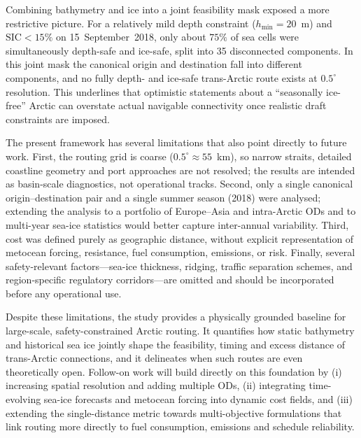 Combining bathymetry and ice into a joint feasibility mask exposed a
more restrictive picture.  For a relatively mild depth constraint
($h_{\min}=20$~m) and $\mathrm{SIC}<15\%$ on 15~September~2018, only
about $75\%$ of sea cells were simultaneously depth-safe and ice-safe,
split into 35 disconnected components.  In this joint mask the canonical
origin and destination fall into different components, and no fully
depth- and ice-safe trans-Arctic route exists at $0.5^{\circ}$
resolution.  This underlines that optimistic statements about a
``seasonally ice-free'' Arctic can overstate actual navigable
connectivity once realistic draft constraints are imposed.

The present framework has several limitations that also point directly
to future work.  First, the routing grid is coarse
($0.5^{\circ}\approx 55$~km), so narrow straits, detailed coastline
geometry and port approaches are not resolved; the results are intended
as basin-scale diagnostics, not operational tracks.  Second, only a
single canonical origin–destination pair and a single summer season
(2018) were analysed; extending the analysis to a portfolio of
Europe–Asia and intra-Arctic ODs and to multi-year sea-ice statistics
would better capture inter-annual variability.  Third, cost was defined
purely as geographic distance, without explicit representation of
metocean forcing, resistance, fuel consumption, emissions, or risk.
Finally, several safety-relevant factors---sea-ice thickness, ridging,
traffic separation schemes, and region-specific regulatory corridors---are
omitted and should be incorporated before any operational use.

Despite these limitations, the study provides a physically grounded
baseline for large-scale, safety-constrained Arctic routing.  It
quantifies how static bathymetry and historical sea ice jointly shape
the feasibility, timing and excess distance of trans-Arctic connections,
and it delineates when such routes are even theoretically open.
Follow-on work will build directly on this foundation by (i) increasing
spatial resolution and adding multiple ODs, (ii) integrating
time-evolving sea-ice forecasts and metocean forcing into dynamic
cost fields, and (iii) extending the single-distance metric towards
multi-objective formulations that link routing more directly to
fuel consumption, emissions and schedule reliability.